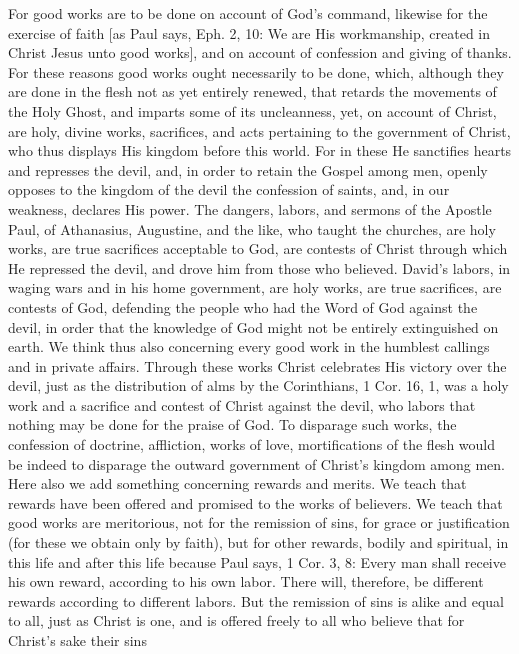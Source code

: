 For good works are to be done on account of God's command, likewise
for the exercise of faith [as Paul says, Eph. 2, 10: We are His
workmanship, created in Christ Jesus unto good works], and on account
of confession and giving of thanks.  For these reasons good works
ought necessarily to be done, which, although they are done in the
flesh not as yet entirely renewed, that retards the movements of the
Holy Ghost, and imparts some of its uncleanness, yet, on account of
Christ, are holy, divine works, sacrifices, and acts pertaining to
the government of Christ, who thus displays His kingdom before this
world.  For in these He sanctifies hearts and represses the devil,
and, in order to retain the Gospel among men, openly opposes to the
kingdom of the devil the confession of saints, and, in our weakness,
declares His power.  The dangers, labors, and sermons of the Apostle
Paul, of Athanasius, Augustine, and the like, who taught the churches,
are holy works, are true sacrifices acceptable to God, are contests
of Christ through which He repressed the devil, and drove him from
those who believed.  David's labors, in waging wars and in his home
government, are holy works, are true sacrifices, are contests of God,
defending the people who had the Word of God against the devil, in
order that the knowledge of God might not be entirely extinguished on
earth.  We think thus also concerning every good work in the humblest
callings and in private affairs.  Through these works Christ
celebrates His victory over the devil, just as the distribution of
alms by the Corinthians, 1 Cor. 16, 1, was a holy work and a
sacrifice and contest of Christ against the devil, who labors that
nothing may be done for the praise of God.  To disparage such works,
the confession of doctrine, affliction, works of love, mortifications
of the flesh would be indeed to disparage the outward government of
Christ's kingdom among men.  Here also we add something concerning
rewards and merits.  We teach that rewards have been offered and
promised to the works of believers.  We teach that good works are
meritorious, not for the remission of sins, for grace or
justification (for these we obtain only by faith), but for other
rewards, bodily and spiritual, in this life and after this life
because Paul says, 1 Cor. 3, 8: Every man shall receive his own
reward, according to his own labor.  There will, therefore, be
different rewards according to different labors.  But the remission
of sins is alike and equal to all, just as Christ is one, and is
offered freely to all who believe that for Christ's sake their sins
